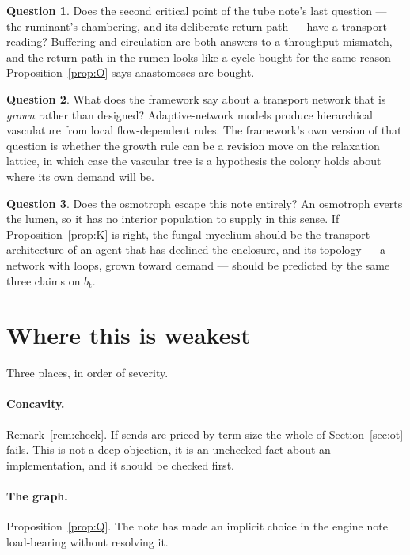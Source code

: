 \documentclass[11pt]{article}
\theoremstyle{plain}
\theoremstyle{definition}
\newtheorem{question}{Question}
\newcommand{\bt}{b_{\mathrm{t}}}
\begin{document}
\begin{question}
Does the second critical point of the tube note's last question --- the ruminant's chambering, and
its deliberate return path --- have a transport reading? Buffering and circulation are both answers to
a throughput mismatch, and the return path in the rumen looks like a cycle bought for the same reason
Proposition~\ref{prop:O} says anastomoses are bought.
\end{question}

\begin{question}
What does the framework say about a transport network that is \emph{grown} rather than designed?
Adaptive-network models produce hierarchical vasculature from local flow-dependent rules. The
framework's own version of that question is whether the growth rule can be a revision move on the
relaxation lattice, in which case the vascular tree is a hypothesis the colony holds about where its
own demand will be.
\end{question}

\begin{question}
Does the osmotroph escape this note entirely? An osmotroph everts the lumen, so it has no interior
population to supply in this sense. If Proposition~\ref{prop:K} is right, the fungal mycelium should
be the transport architecture of an agent that has declined the enclosure, and its topology --- a
network with loops, grown toward demand --- should be predicted by the same three claims on $\bt$.
\end{question}

\section{Where this is weakest}
\label{sec:weak}

Three places, in order of severity.

\paragraph{Concavity.} Remark~\ref{rem:check}. If sends are priced by term size the whole of
Section~\ref{sec:ot} fails. This is not a deep objection, it is an unchecked fact about an
implementation, and it should be checked first.

\paragraph{The graph.} Proposition~\ref{prop:Q}. The note has made an implicit choice in the engine
note load-bearing without resolving it.
\end{document}
